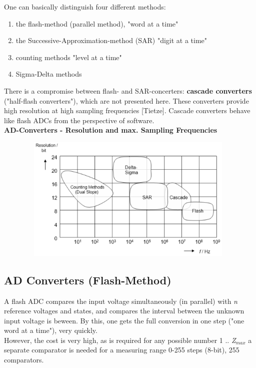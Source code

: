 One can basically distinguish four different methods:

\begin{enumerate}
\item  the flash-method (parallel method),  "word at a time"
\item  the Successive-Approximation-method (SAR) "digit at a time"
\item  counting methods "level at a time"
\item  Sigma-Delta methods
\end{enumerate}

There is a compromise between flash- and SAR-concerters: \textbf{cascade converters} ("half-flash converters"), which are not presented here. These converters provide high resolution at high sampling frequencies [Tietze]. Cascade converters behave like flash ADCs from the perspective of software.\\
\newpage
{\rot\bf AD-Converters - Resolution and max. Sampling Frequencies}

    \begin{figure}[h]
    \centering
    \includegraphics[width=11cm, height=6cm]{Images/image174.png}
    \label{fig:Fig 128}
    \end{figure}

\subsection{AD Converters (Flash-Method)}

A flash ADC compares the input voltage simultaneously (in parallel) with \textit{n} reference voltages and states, and compares the interval between the unknown input voltage is beween. By this, one gets the full conversion in one step ("one word at a time"), very quickly.\\

However, the cost is very high, as is required for any possible number 1 .. \textit{Z${}_{max}$} a separate comparator is needed  for a measuring range 0-255 steps (8-bit), 255 comparators.\\

